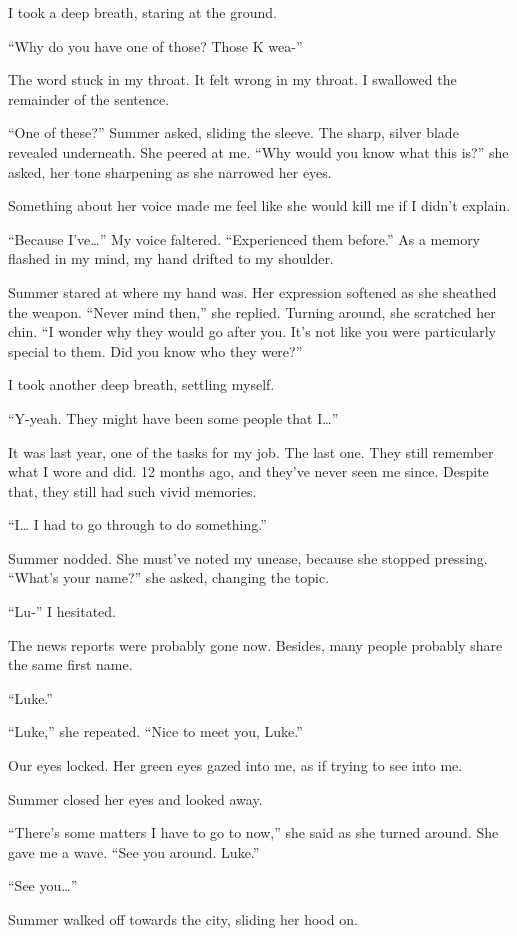 I took a deep breath, staring at the ground.

“Why do you have one of those? Those K wea-”

The word stuck in my throat. It felt wrong in my throat. I swallowed the remainder of the sentence.

“One of these?” Summer asked, sliding the sleeve. The sharp, silver blade revealed underneath. She peered at me. “Why would you know what this is?” she asked, her tone sharpening as she narrowed her eyes.

Something about her voice made me feel like she would kill me if I didn’t explain.

“Because I’ve…” My voice faltered. “Experienced them before.” As a memory flashed in my mind, my hand drifted to my shoulder.

Summer stared at where my hand was. Her expression softened as she sheathed the weapon. “Never mind then,” she replied. Turning around, she scratched her chin. “I wonder why they would go after you. It’s not like you were particularly special to them. Did you know who they were?”

I took another deep breath, settling myself. 

“Y-yeah. They might have been some people that I…”

It was last year, one of the tasks for my job. The last one. They still remember what I wore and did. 12 months ago, and they’ve never seen me since. Despite that, they still had such vivid memories.

“I… I had to go through to do something.”

Summer nodded. She must’ve noted my unease, because she stopped pressing. “What’s your name?” she asked, changing the topic.

“Lu-” I hesitated. 

The news reports were probably gone now. Besides, many people probably share the same first name.

“Luke.”

“Luke,” she repeated. “Nice to meet you, Luke.”

Our eyes locked. Her green eyes gazed into me, as if trying to see into me. 

Summer closed her eyes and looked away.

“There’s some matters I have to go to now,” she said as she turned around. She gave me a wave. “See you around. Luke.”

“See you…”

Summer walked off towards the city, sliding her hood on.

